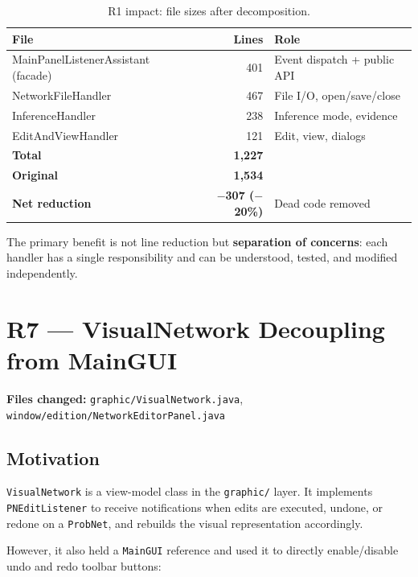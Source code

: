 \documentclass[12pt,a4paper]{article}
\newcommand{\code}[1]{\texttt{#1}}
\newcommand{\file}[1]{\texttt{#1}}
\begin{document}
\begin{table}[H]
\centering
\small
\begin{tabular}{lrl}
\toprule
\textbf{File} & \textbf{Lines} & \textbf{Role} \\
\midrule
MainPanelListenerAssistant (facade) & 401  & Event dispatch + public API \\
NetworkFileHandler                  & 467  & File I/O, open/save/close \\
InferenceHandler                    & 238  & Inference mode, evidence \\
EditAndViewHandler                  & 121  & Edit, view, dialogs \\
\midrule
\textbf{Total}                      & \textbf{1,227} & \\
\textbf{Original}                   & \textbf{1,534} & \\
\textbf{Net reduction}              & \textbf{$-$307 ($-$20\%)} & Dead code removed \\
\bottomrule
\end{tabular}
\caption{R1 impact: file sizes after decomposition.}
\label{tab:r1-impact}
\end{table}

The primary benefit is not line reduction but \textbf{separation of
concerns}: each handler has a single responsibility and can be
understood, tested, and modified independently.


\section{R7 --- VisualNetwork Decoupling from MainGUI}
\label{sec:r7}

\textbf{Files changed:} \file{graphic/VisualNetwork.java},
\file{window/edition/NetworkEditorPanel.java}

\subsection{Motivation}

\code{VisualNetwork} is a view-model class in the \code{graphic/} layer.
It implements \code{PNEditListener} to receive notifications when edits
are executed, undone, or redone on a \code{ProbNet}, and rebuilds the
visual representation accordingly.

However, it also held a \code{MainGUI} reference and used it to directly
enable/disable undo and redo toolbar buttons:
\end{document}
